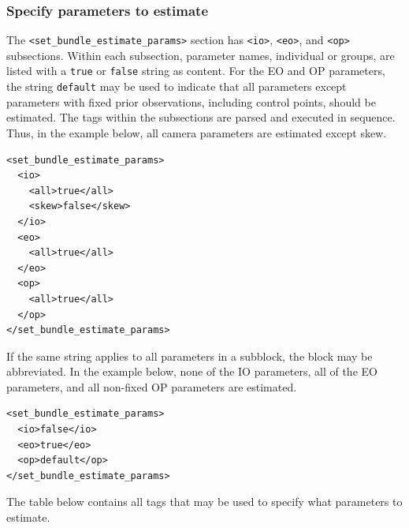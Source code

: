\documentclass{article}
\begin{document}
\subsubsection{Specify parameters to estimate}
\label{sec:setBundleEstimateParams}
The \texttt{<set\_bundle\_estimate\_params>} section has \texttt{<io>}, \texttt{<eo>}, and
\texttt{<op>} subsections. Within each subsection, parameter names,
individual or groups, are listed with a \texttt{true} or \texttt{false} string as
content. For the EO and OP parameters, the string \texttt{default} may be
used to indicate that all parameters except parameters with fixed
prior observations, including control points, should be estimated.
The tags within the subsections are parsed and executed in
sequence. Thus, in the example below, all camera parameters are
estimated except skew.
\begin{verbatim}
<set_bundle_estimate_params>
  <io>
    <all>true</all>
    <skew>false</skew>
  </io>
  <eo>
    <all>true</all>
  </eo>
  <op>
    <all>true</all>
  </op>
</set_bundle_estimate_params>
\end{verbatim}
If the same string applies to all parameters in a subblock, the block
may be abbreviated. In the example below, none of the IO parameters,
all of the EO parameters, and all non-fixed OP parameters are
estimated.
\begin{verbatim}
<set_bundle_estimate_params>
  <io>false</io>
  <eo>true</eo>
  <op>default</op>
</set_bundle_estimate_params>
\end{verbatim}
The table below contains all tags that may be used to specify what
parameters to estimate.
\end{document}
